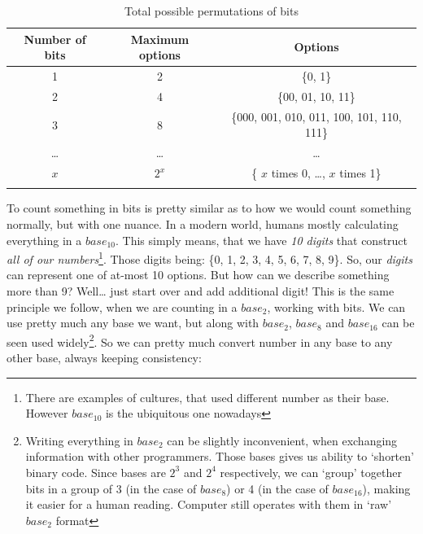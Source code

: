 \documentclass{article}
\begin{document}
            \begin{table}[h]
                \centering
                \begin{longtable}{|c|c|c|}
                    \hline
                    Number of bits & Maximum options & Options \\\hline
                    1 & 2 & \{0, 1\} \\\hline
                    2 & 4 & \{00, 01, 10, 11\} \\\hline
                    3 & 8 & \{000, 001, 010, 011, 100, 101, 110, 111\} \\\hline
                    \ldots & \ldots & \ldots \\\hline
                    $x$ & $2^x$ & \{ $x$ times 0, \ldots, $x$ times 1\} \\\hline
                    \caption{Total possible permutations of bits}

                \end{longtable}
            \end{table}

            To count something in bits is pretty similar as to how we would count something normally, but with one nuance. In a modern world, humans mostly calculating 
            everything in a $base_{10}$. This simply means, that we have \emph{10 digits} that construct \emph{all of our numbers}\footnote{There are examples of cultures, that used different number as their base. However $base_{10}$ is the ubiquitous one nowadays}. 
            Those digits being: \{0, 1, 2, 3, 4, 5, 6, 7, 8, 9\}. So, our \emph{digits} can represent one of at-most 10 options. But how can we describe something more
            than 9? Well\ldots{} just start over and add additional digit! This is the same principle we follow, when we are counting in a $base_2$, working with bits.
            We can use pretty much any base we want, but along with $base_2$, $base_8$ and $base_{16}$ can be seen used widely\footnote{Writing everything in $base_2$
            can be slightly inconvenient, when exchanging information with other programmers. Those bases gives us ability to `shorten' binary code. Since bases
            are $2^3$ and $2^4$ respectively, we can `group' together bits in a group of 3 (in the case of $base_8$) or 4 (in the case of $base_{16}$), making it 
            easier for a human reading. Computer still operates with them in `raw' $base_2$ format}. So we can pretty much convert number in any base to any other 
            base, always keeping consistency:
\end{document}
